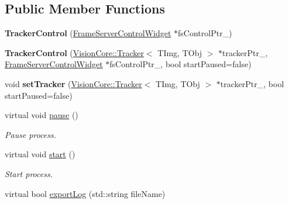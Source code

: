 \subsection*{Public Member Functions}
\begin{DoxyCompactItemize}
\item 
\hypertarget{class_tracker_control_ae5bf27e4d42ef4cbe912e3246ab01553}{}{\bfseries Tracker\+Control} (\hyperlink{class_frame_server_control_widget}{Frame\+Server\+Control\+Widget} $\ast$fs\+Control\+Ptr\+\_\+)\label{class_tracker_control_ae5bf27e4d42ef4cbe912e3246ab01553}

\item 
\hypertarget{class_tracker_control_afc27bbdf05ee68eec54b6cb1b1713d9d}{}{\bfseries Tracker\+Control} (\hyperlink{class_vision_core_1_1_interfaces_1_1_tracker}{Vision\+Core\+::\+Tracker}$<$ T\+Img, T\+Obj $>$ $\ast$tracker\+Ptr\+\_\+, \hyperlink{class_frame_server_control_widget}{Frame\+Server\+Control\+Widget} $\ast$fs\+Control\+Ptr\+\_\+, bool start\+Paused=false)\label{class_tracker_control_afc27bbdf05ee68eec54b6cb1b1713d9d}

\item 
\hypertarget{class_tracker_control_a25836a6bfbe3cc2685f1caca18dd3d03}{}void {\bfseries set\+Tracker} (\hyperlink{class_vision_core_1_1_interfaces_1_1_tracker}{Vision\+Core\+::\+Tracker}$<$ T\+Img, T\+Obj $>$ $\ast$tracker\+Ptr\+\_\+, bool start\+Paused=false)\label{class_tracker_control_a25836a6bfbe3cc2685f1caca18dd3d03}

\item 
\hypertarget{class_tracker_control_a7167f5c196fc5e167bfabde1a730e81d}{}virtual void \hyperlink{class_tracker_control_a7167f5c196fc5e167bfabde1a730e81d}{pause} ()\label{class_tracker_control_a7167f5c196fc5e167bfabde1a730e81d}

\begin{DoxyCompactList}\small\item\em Pause process. \end{DoxyCompactList}\item 
\hypertarget{class_tracker_control_a60de64d75454385b23995437f1d72669}{}virtual void \hyperlink{class_tracker_control_a60de64d75454385b23995437f1d72669}{start} ()\label{class_tracker_control_a60de64d75454385b23995437f1d72669}

\begin{DoxyCompactList}\small\item\em Start process. \end{DoxyCompactList}\item 
\hypertarget{class_tracker_control_aaadbbf21c8bf5d7b6be811068d1ccc21}{}virtual bool \hyperlink{class_tracker_control_aaadbbf21c8bf5d7b6be811068d1ccc21}{export\+Log} (std\+::string file\+Name)\label{class_tracker_control_aaadbbf21c8bf5d7b6be811068d1ccc21}


\end{DoxyCompactItemize}
